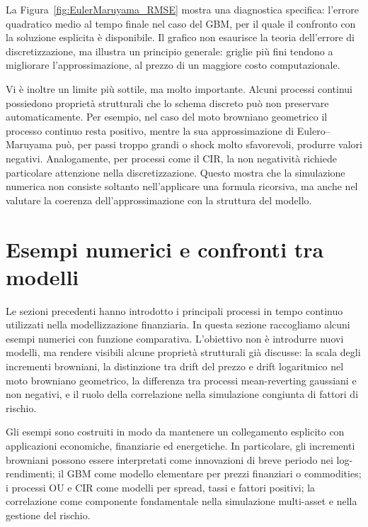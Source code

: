 La Figura~\ref{fig:EulerMaruyama_RMSE} mostra una diagnostica specifica:
l'errore quadratico medio al tempo finale nel caso del GBM, per il quale
il confronto con la soluzione esplicita \`{e} disponibile. Il grafico non
esaurisce la teoria dell'errore di discretizzazione, ma illustra un
principio generale: griglie pi\`{u} fini tendono a migliorare
l'approssimazione, al prezzo di un maggiore costo computazionale.

Vi \`{e} inoltre un limite pi\`{u} sottile, ma molto importante. Alcuni
processi continui possiedono propriet\`{a} strutturali che lo schema
discreto pu\`{o} non preservare automaticamente. Per esempio, nel caso
del moto browniano geometrico il processo continuo resta positivo,
mentre la sua approssimazione di Eulero--Maruyama pu\`{o}, per passi
troppo grandi o shock molto sfavorevoli, produrre valori negativi.
Analogamente, per processi come il CIR, la non negativit\`{a} richiede
particolare attenzione nella discretizzazione. Questo mostra che la
simulazione numerica non consiste soltanto nell'applicare una formula
ricorsiva, ma anche nel valutare la coerenza dell'approssimazione con la
struttura del modello.

\section{Esempi numerici e confronti tra modelli}

Le sezioni precedenti hanno introdotto i principali processi in tempo
continuo utilizzati nella modellizzazione finanziaria. In questa sezione
raccogliamo alcuni esempi numerici con funzione comparativa. L'obiettivo
non \`{e} introdurre nuovi modelli, ma rendere visibili alcune propriet\`{a}
strutturali gi\`{a} discusse: la scala degli incrementi browniani, la
distinzione tra drift del prezzo e drift logaritmico nel moto browniano
geometrico, la differenza tra processi mean-reverting gaussiani e non
negativi, e il ruolo della correlazione nella simulazione congiunta di
fattori di rischio.

Gli esempi sono costruiti in modo da mantenere un collegamento esplicito
con applicazioni economiche, finanziarie ed energetiche. In particolare,
gli incrementi browniani possono essere interpretati come innovazioni di
breve periodo nei log-rendimenti; il GBM come modello elementare per
prezzi finanziari o commodities; i processi OU e CIR come modelli per
spread, tassi e fattori positivi; la correlazione come componente
fondamentale nella simulazione multi-asset e nella gestione del rischio.

